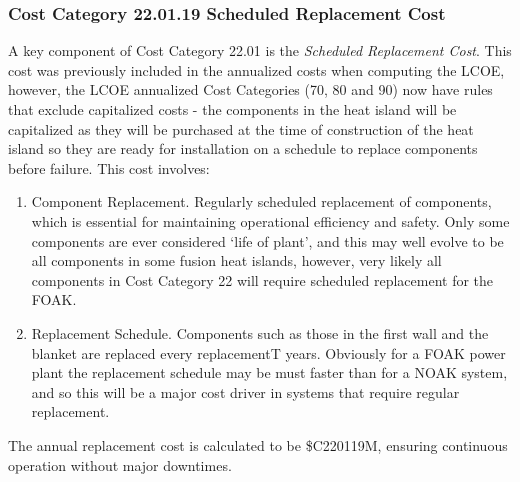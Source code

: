 \subsubsection*{Cost Category 22.01.19 Scheduled Replacement Cost}

A key component of Cost Category 22.01 is the \textit{Scheduled Replacement Cost}.  This cost was previously included in the annualized costs when computing the LCOE, however, the LCOE annualized Cost Categories (70, 80 and 90) now have rules that exclude capitalized costs - the components in the heat island will be capitalized as they will be purchased at the time of construction of the heat island so they are ready for installation on a schedule to replace components before failure.  This cost involves:

\begin{enumerate}
    \item Component Replacement. Regularly scheduled replacement of components, which is essential for maintaining operational efficiency and safety.  Only some components are ever considered `life of plant', and this may well evolve to be all components in some fusion heat islands, however, very likely all components in Cost Category 22 will require scheduled replacement for the FOAK.
    \item Replacement Schedule. Components such as those in the first wall and the blanket are replaced every replacementT years.  Obviously for a FOAK power plant the replacement schedule may be must faster than for a NOAK system, and so this will be a major cost driver in systems that require regular replacement.
\end{enumerate}

The annual replacement cost is calculated to be \$C220119M, ensuring continuous operation without major downtimes.